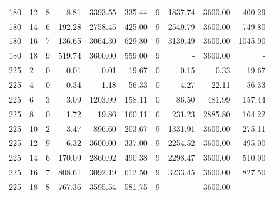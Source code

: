 \begin{appendices}
\begin{table*}[h]
\begin{center}
\begin{tabular} {l l | r r r r | r r r r}
180 & 12                               &  8              &  8.81         &  3393.55       &  335.44     &  9          &  1837.74      &  3600.00    &  400.29       \\ 
180 & 14                               &  6              &  192.28       &  2758.45       &  425.00     &  9          &  2549.79      &  3600.00    &  749.80       \\ 
180 & 16                               &  7              &  136.65       &  3064.30       &  629.80     &  9          &  3139.49      &  3600.00    &  1045.00      \\ 
180 & 18                               &  9              &  519.74       &  3600.00       &  559.00     &  9          &  -            &  3600.00    &  -            \\ 
225 & 2                                &  0              &  0.01         &  0.01          &  19.67      &  0          &  0.15         &  0.33       &  19.67        \\ 
225 & 4                                &  0              &  0.34         &  1.18          &  56.33      &  0          &  4.27         &  22.11      &  56.33        \\ 
225 & 6                                &  3              &  3.09         &  1203.99       &  158.11     &  0          &  86.50        &  481.99     &  157.44       \\ 
225 & 8                                &  0              &  1.72         &  19.86         &  160.11     &  6          &  231.23       &  2885.80    &  164.22       \\ 
225 & 10                               &  2              &  3.47         &  896.60        &  203.67     &  9          &  1331.91      &  3600.00    &  275.11       \\ 
225 & 12                               &  9              &  6.32         &  3600.00       &  337.00     &  9          &  2254.52      &  3600.00    &  495.00       \\ 
225 & 14                               &  6              &  170.09       &  2860.92       &  490.38     &  9          &  2298.47      &  3600.00    &  510.00       \\ 
225 & 16                               &  7              &  808.61       &  3092.19       &  612.50     &  9          &  3233.45      &  3600.00    &  827.50       \\ 
225 & 18                               &  8              &  767.36       &  3595.54       &  581.75     &  9          &  -            &  3600.00    &  -            \\ 

\end{tabular}
\end{center}
\end{table*}
\end{appendices}
